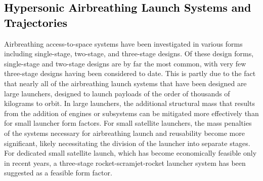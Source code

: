   
  
  
  

   
   
   






    \textcolor{black}{
  \section{Hypersonic Airbreathing Launch Systems and Trajectories}\label{sec:AscentTrajectories}
}
  
 
 \noindent
Airbreathing access-to-space systems have been investigated in various forms including single-stage, two-stage, and three-stage designs. 
Of these design forms, single-stage and two-stage designs are by far the most common, with very few three-stage designs having been considered to date. This is partly due to the fact that nearly all of the airbreathing launch systems that have been designed are large launchers, designed to launch payloads of the order of thousands of kilograms to orbit. In large launchers, the additional structural mass that results from the addition of engines or subsystems can be mitigated more effectively than for small launcher form factors.
For small satellite launchers, the mass penalties of the systems necessary for airbreathing launch and reusability become more significant, likely necessitating the division of the launcher into separate stages. 
For dedicated small satellite launch, which has become economically feasible only in recent years, a three-stage rocket-scramjet-rocket launcher system has been suggested as a feasible form factor\cite{Preller2017b}. 

